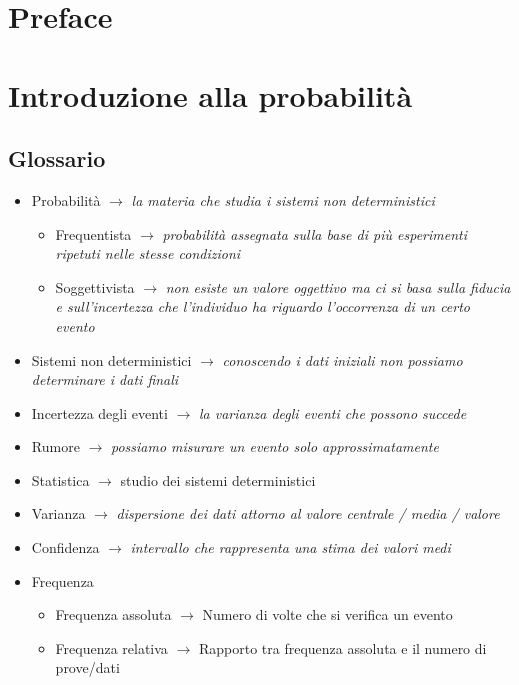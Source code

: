 \documentclass[]{article}
\begin{document}
    \section*{Preface}
    \tableofcontents
    \newpage
    \section{Introduzione alla probabilità}    
    \subsection{Glossario}
    \begin{itemize}
        \item Probabilità $\rightarrow$ \textit{la materia che studia i sistemi non deterministici}
        \begin{itemize}
            \item Frequentista $\rightarrow $ \textit{probabilità assegnata sulla base di più esperimenti ripetuti nelle stesse condizioni}
            \item Soggettivista $\rightarrow $ \textit{non esiste un valore oggettivo ma ci si basa sulla fiducia e sull'incertezza che l'individuo ha riguardo l'occorrenza di un certo evento}
        \end{itemize}
        \item Sistemi non deterministici $\rightarrow$ \textit{conoscendo i dati iniziali non possiamo determinare i dati finali}
        \item Incertezza degli eventi $\rightarrow$ \textit{la varianza degli eventi che possono succede}
        \item Rumore $\rightarrow$ \textit{possiamo misurare un evento solo approssimatamente}
        \item Statistica $\rightarrow$ studio dei sistemi deterministici
        \item Varianza $\rightarrow$ \textit{dispersione dei dati attorno al valore centrale / media / valore}
        \item Confidenza $\rightarrow$ \textit{intervallo che rappresenta una stima dei valori medi}
        \item Frequenza
        \begin{itemize}
            \item Frequenza assoluta $\rightarrow$ Numero di volte che si verifica un evento
            \item Frequenza relativa $\rightarrow$ Rapporto tra frequenza assoluta e il numero di prove/dati

\end{itemize}
\end{itemize}
\end{document}
